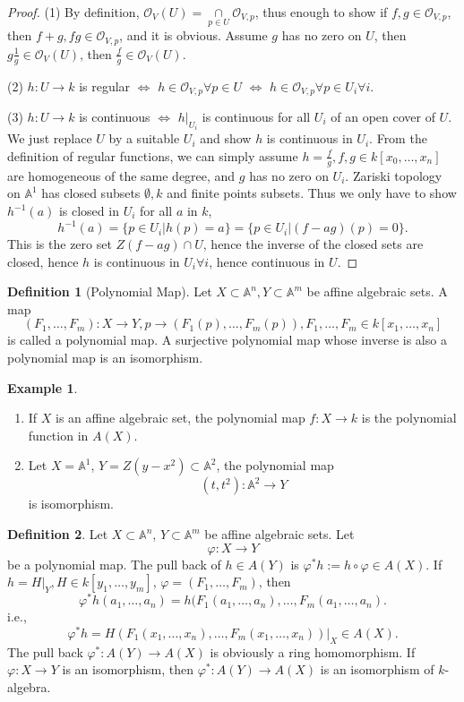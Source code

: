 \documentclass{amsart}
\theoremstyle{plain}
\theoremstyle{definition}
\newtheorem{definition}{Definition}
\newtheorem{example}{Example}
\theoremstyle{remark}
\numberwithin{equation}{section}
\begin{document}
\begin{proof}
	(1) By definition, $ \mathcal{O}_V(U)=\mathop{\cap}\limits_{p\in U} \mathcal{O}_{V,p} $, thus enough to show if $ f,g\in \mathcal{O}_{V,p} $, then $ f+g, fg \in \mathcal{O}_{V,p}$, and it is obvious. Assume $ g $ has no zero on $ U $, then $ g\frac{1}{g}\in \mathcal{O}_V(U) $, then $ \frac{f}{g}\in \mathcal{O}_V(U) $.
	
	(2) $ h:U\to k $ is regular $ \Leftrightarrow $ $ h\in \mathcal{O}_{V,p} \forall p\in U$ $ \Leftrightarrow $ $ h\in \mathcal{O}_{V,p} \forall p\in U_i \forall i$.
	
	(3) $ h:U\to k  $ is continuous $ \Leftrightarrow $ $ h|_{U_i} $ is continuous for all $ U_i $ of an open cover of $ U $. We just replace $ U $ by a suitable $ U_i $ and show $ h $ is continuous in $ U_i $. From the definition of regular functions, we can simply assume $ h=\frac{f}{g}, f,g\in k[x_0,\dots,x_n] $ are homogeneous of the same degree, and $ g $ has no zero on $ U_i $. Zariski topology on $ \mathbb{A}^1 $ has closed subsets $ \emptyset,k $ and finite points subsets. Thus we only have to show $ h^{-1}(a) $ is closed in $ U_i $ for all $ a $ in $ k $,
	\begin{equation}
	h^{-1}(a)=\{ p\in U_i|h(p)=a \}= \{ p\in U_i|(f-ag)(p)=0 \}.
	\end{equation}
	This is the zero set $ Z(f-ag)\cap U $, hence the inverse of the closed sets are closed, hence $ h $ is continuous in $ U_i \forall i$, hence continuous in $ U $.
\end{proof}
\begin{definition}[Polynomial Map]
	Let $ X\subset \mathbb{A}^n, Y\subset \mathbb{A}^m $ be affine algebraic sets. A map 
	$$
	(F_1,\dots,F_m):X\to Y,p\to (F_1(p),\dots,F_m(p)),F_1,\dots,F_m\in k[x_1,\dots,x_n]
	$$
	is called a polynomial map. A surjective polynomial map whose inverse is also a polynomial map is an isomorphism.
\end{definition}
\begin{example}
	\begin{enumerate}
		\item If $ X $ is an affine algebraic set, the polynomial map $ f:X\to k $ is the polynomial function in $ A(X) $.
		\item Let $ X=\mathbb{A}^1 $, $ Y=Z(y-x^2)\subset \mathbb{A}^2 $, the polynomial map 
		$$
		(t,t^2):\mathbb{A}^2\to Y
		$$
		is isomorphism.
	\end{enumerate}
\end{example}
\begin{definition}
	Let $ X\subset \mathbb{A}^n $, $ Y\subset \mathbb{A}^m $ be affine algebraic sets. Let 
	$$
	\varphi:X\to Y
	$$
	be a polynomial map.
	The pull back of $ h\in A(Y) $ is $ \varphi^\ast h:=h\circ \varphi \in A(X) $. If $ h=H|_Y, H\in k[y_1,\dots,y_m] $, $ \varphi =(F_1,\dots,F_m) $, then 
	$$
	\varphi^\ast h(a_1,\dots,a_n)=h(F_1(a_1,\dots,a_n),\dots, F_m(a_1,\dots,a_n ).
	$$
	i.e., 
	$$
	\varphi^\ast h = H( F_1(x_1,\dots,x_n),\dots, F_m(x_1,\dots,x_n) )|_X\in A(X).
	$$
	The pull back $ \varphi^\ast:A(Y)\to A(X) $ is obviously a ring homomorphism. If $ \varphi:X\to Y $ is an isomorphism, then $ \varphi^\ast:A(Y)\to A(X) $ is an isomorphism of $ k $-algebra.
\end{definition}
\end{document}
